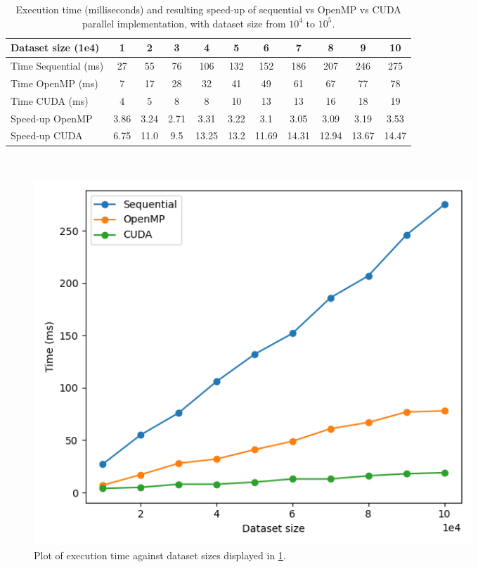 \documentclass[10pt,twocolumn,letterpaper]{article}
\begin{document}
\clearpage
\begin{table}[h]
	\centering
	\begin{tabular}{|l|c|c|c|c|c|c|c|c|c|c|}
		\hline
		Dataset size (1e4)   & 1    & 2    & 3    & 4    & 5    & 6    & 7    & 8    & 9    & 10   \\ \hline
		Time Sequential (ms) & 27 & 55 & 76 & 106 & 132 & 152 & 186 & 207 & 246 & 275  \\ \hline
		Time OpenMP (ms)     & 7 & 17 & 28 & 32 & 41 & 49 & 61 & 67 & 77 & 78  \\ \hline
		Time CUDA (ms)       & 4 & 5 & 8 & 8 & 10 & 13 & 13 & 16 & 18 & 19 \\ \hline
		Speed-up OpenMP   & 3.86 & 3.24 & 2.71 & 3.31 & 3.22 & 3.1 & 3.05 & 3.09 & 3.19 & 3.53  \\ \hline
		Speed-up CUDA   & 6.75 & 11.0 & 9.5 & 13.25 & 13.2 & 11.69 & 14.31 & 12.94 & 13.67 & 14.47  \\ \hline
	\end{tabular}\\
	\bigskip
	\caption{Execution time (milliseconds) and resulting speed-up of sequential vs OpenMP vs CUDA parallel implementation, with dataset size from $10^4$ to $10^5$.}
	\label{table:time_to_size}
\end{table}
\begin{figure}[h]
	\begin{center}
		\includegraphics[width=0.8\textwidth]{img/time_to_size.png}
	\end{center}
	\caption{Plot of execution time against dataset sizes displayed in \cref{table:time_to_size}.}
	\label{fig:time_to_size}
\end{figure}
\end{document}

